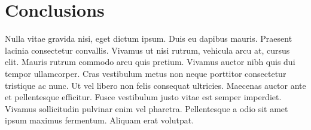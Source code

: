 \section{Conclusions}\label{sec:conclusions}
Nulla vitae gravida nisi, eget dictum ipsum.
Duis eu dapibus mauris.
Praesent lacinia consectetur convallis.
Vivamus ut nisi rutrum, vehicula arcu at, cursus elit.
Mauris rutrum commodo arcu quis pretium.
Vivamus auctor nibh quis dui tempor ullamcorper.
Cras vestibulum metus non neque porttitor consectetur tristique ac nunc.
Ut vel libero non felis consequat ultricies.
Maecenas auctor ante et pellentesque efficitur.
Fusce vestibulum justo vitae est semper imperdiet.
Vivamus sollicitudin pulvinar enim vel pharetra.
Pellentesque a odio sit amet ipsum maximus fermentum.
Aliquam erat volutpat.
